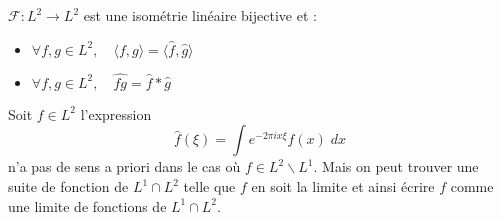 \begin{theorem}
    $ \mathcal{F} : L^2 \longrightarrow L^2$ est une isométrie linéaire bijective et :
    \begin{itemize}
        \item $ \forall f, g \in L^2, \quad \langle f, g \rangle = \langle \hat{f} , \hat{g} \rangle$ 
        \item $ \forall f, g \in L^2, \quad \widehat{fg} = \hat{f} \ast \hat{g} $ 
    \end{itemize}
\end{theorem}

\begin{remark}
    Soit $ f \in L^2$ l'expression $$ \hat{f}(\xi) = \int e^{-2 \pi i x \xi} f(x) \; dx $$ n'a pas de sens a priori dans le cas où $f \in L^2 \backslash L^1$. 
    {Mais} on peut trouver une suite de fonction de $L^1 \cap L^2$ telle que $f$ en soit la limite et ainsi écrire $f$ comme une limite de fonctions de $L^1 \cap L^2$.
\end{remark}

